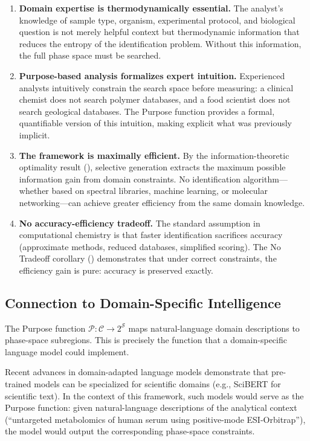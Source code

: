 \documentclass[11pt,twocolumn,a4paper]{article}
\theoremstyle{definition}
\theoremstyle{remark}
\newcommand{\Sspace}{\mathcal{S}}
\newcommand{\Purpose}{\mathcal{P}}
\newcommand{\Context}{\mathcal{C}}
\begin{document}
\begin{enumerate}[label=(\roman*)]
  \item \textbf{Domain expertise is thermodynamically essential.} The analyst's knowledge of sample type, organism, experimental protocol, and biological question is not merely helpful context but thermodynamic information that reduces the entropy of the identification problem. Without this information, the full phase space must be searched.

  \item \textbf{Purpose-based analysis formalizes expert intuition.} Experienced analysts intuitively constrain the search space before measuring: a clinical chemist does not search polymer databases, and a food scientist does not search geological databases. The Purpose function provides a formal, quantifiable version of this intuition, making explicit what was previously implicit.

  \item \textbf{The framework is maximally efficient.} By the information-theoretic optimality result (), selective generation extracts the maximum possible information gain from domain constraints. No identification algorithm---whether based on spectral libraries, machine learning, or molecular networking---can achieve greater efficiency from the same domain knowledge.

  \item \textbf{No accuracy-efficiency tradeoff.} The standard assumption in computational chemistry is that faster identification sacrifices accuracy (approximate methods, reduced databases, simplified scoring). The No Tradeoff corollary () demonstrates that under correct constraints, the efficiency gain is pure: accuracy is preserved exactly.
\end{enumerate}

\subsection{Connection to Domain-Specific Intelligence}\label{sec:domain-intelligence}

The Purpose function $\Purpose\colon \Context \to 2^{\Sspace}$ maps natural-language domain descriptions to phase-space subregions. This is precisely the function that a domain-specific language model could implement.

Recent advances in domain-adapted language models \citep{gururangan2020,beltagy2019} demonstrate that pre-trained models can be specialized for scientific domains (e.g., SciBERT for scientific text). In the context of this framework, such models would serve as the Purpose function: given natural-language descriptions of the analytical context (``untargeted metabolomics of human serum using positive-mode ESI-Orbitrap''), the model would output the corresponding phase-space constraints.
\end{document}
